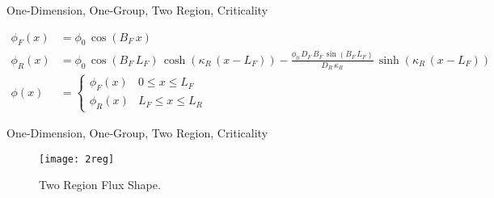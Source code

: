 \begin{frame}{One-Dimension, One-Group, Two Region, Criticality}
  \begin{table}
    \label{tab:2reg}
    \begin{center}
    \end{center}
  \end{table}
  \begin{align}
    \phi_F(x) &= \phi_0 \, \cos(B_F \, x) \\
    \phi_R(x) &= \phi_0 \, \cos(B_F \, L_F) \, \cosh(\kappa_R \, (x-L_F)) - 
      \frac{\phi_0 \, D_F \, B_F \, \sin(B_F\,L_F)}{D_R \, \kappa_R} \, 
      \sinh(\kappa_R\,(x-L_F)) \\
    \label{eq:analytic_2reg}
    \phi(x) &=
    \begin{cases}
      \phi_F(x) & 0   \le x \le L_F \\
      \phi_R(x) & L_F \le x \le L_R
    \end{cases}
  \end{align}
\end{frame}

\begin{frame}{One-Dimension, One-Group, Two Region, Criticality}
  \begin{figure}
    \centering
    \texttt{[image: 2reg]}
    \caption{Two Region Flux Shape.}
    \label{fig:2reg}
  \end{figure}
\end{frame}

